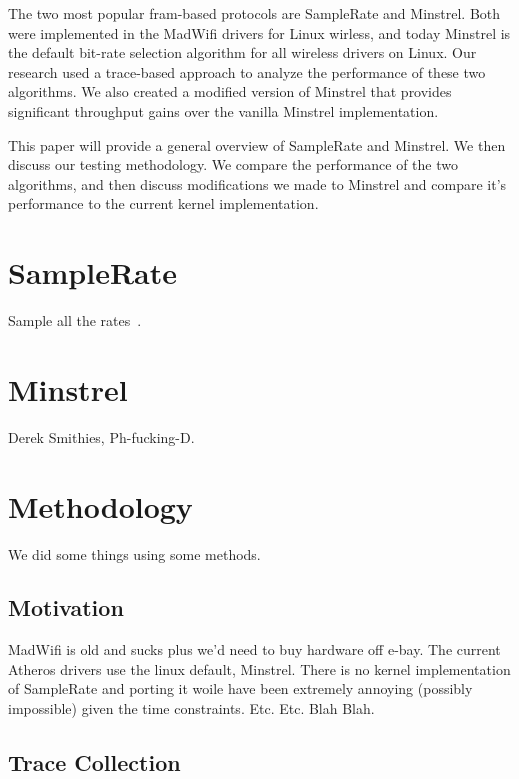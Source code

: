 \documentclass[letterpaper,twocolumn,10pt]{article}
\begin{document}
The two most popular fram-based protocols are SampleRate and Minstrel. Both were implemented in the MadWifi drivers for Linux wirless, and today Minstrel is the default bit-rate selection algorithm for all wireless drivers on Linux. Our research used a trace-based approach to analyze the performance of these two algorithms. We also created a modified version of Minstrel that provides significant throughput gains over the vanilla Minstrel implementation. 

This paper will provide a general overview of SampleRate and Minstrel. We then discuss our testing methodology. We compare the performance of the two algorithms, and then discuss modifications we made to Minstrel and compare it's performance to the current kernel implementation.
\section{SampleRate}

Sample all the rates~\cite{samplerate, sprout, minstrel}.

\section{Minstrel}

Derek Smithies, Ph-fucking-D.

\section{Methodology}

We did some things using some methods.

\subsection{Motivation}

MadWifi is old and sucks plus we'd need to buy hardware off e-bay. The current Atheros drivers use the linux default, Minstrel. There is no kernel implementation of SampleRate and porting it woile have been extremely annoying (possibly impossible) given the time constraints. Etc. Etc. Blah Blah. 

\subsection{Trace Collection}
\end{document}
